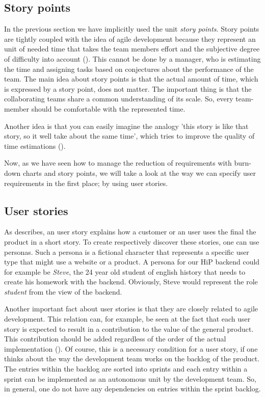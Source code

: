 \subsection{Story points}
\label{storyPoints}
In the previous section we have implicitly used the unit  \emph{story points}. Story points are tightly coupled with the idea of agile development because they represent an unit of needed time that takes the team members effort and the subjective degree of difficulty into account (\cite{ScrumMeth}). This cannot be done by a manager, who is estimating the time and assigning tasks based on conjectures about the performance of the team. The main idea about story points is that the actual amount of time, which is expressed by a story point, does not matter. The important thing is that the collaborating teams share a common understanding of its scale. So, every team-member should be comfortable with the represented time. 

Another idea is that you can easily imagine the analogy 'this story is like that story, so it well take about the same time', which tries to improve the quality of time estimations (\cite{cohn2004user}).

Now, as we have seen how to manage the reduction of requirements with burn-down charts and story points, we will take a look at the way we can specify user requirements in the first place; by using user stories.

\subsection{User stories}
As \cite{Pichler:2010aa} describes, an user story explains how a customer or an user uses the final the product in a short story. To create respectively discover these stories, one can use personas. Such a persona is a fictional character that represents a specific user type that might use a website or a product. A persona for our \ac{HiP} backend could for example be \emph{Steve}, the 24 year old student of english history that needs to create his homework with the backend. Obviously, Steve would represent the role \emph{student} from the view of the backend. 

Another important fact about user stories is that they are closely related to agile development. This relation can, for example, be seen at the fact that each user story is expected to result in a contribution to the value of the general product. This contribution should be added regardless of the order of the actual implementation (\cite{Alliance:2013aa}). Of course, this is a necessary condition for a user story, if one thinks about the way the development team works on the backlog of the product. The entries within the backlog are sorted into sprints and each entry within a sprint can be implemented as an autonomous unit by the development team. So, in general, one do not have any dependencies on entries within the sprint backlog.

